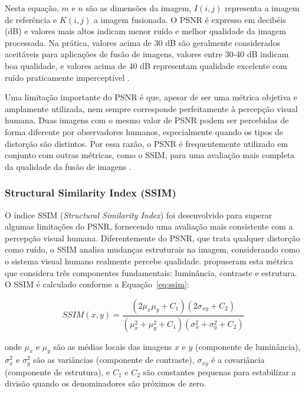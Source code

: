 Nesta equação, $m$ e $n$ são as dimensões da imagem, $I(i,j)$ representa a imagem de referência e $K(i,j)$ a imagem fusionada. O PSNR é expresso em decibéis (dB) e valores mais altos indicam menor ruído e melhor qualidade da imagem processada. Na prática, valores acima de 30 dB são geralmente considerados aceitáveis para aplicações de fusão de imagens, valores entre 30-40 dB indicam boa qualidade, e valores acima de 40 dB representam qualidade excelente com ruído praticamente imperceptível \cite{hore2010image}.

Uma limitação importante do PSNR é que, apesar de ser uma métrica objetiva e amplamente utilizada, nem sempre corresponde perfeitamente à percepção visual humana. Duas imagens com o mesmo valor de PSNR podem ser percebidas de forma diferente por observadores humanos, especialmente quando os tipos de distorção são distintos. Por essa razão, o PSNR é frequentemente utilizado em conjunto com outras métricas, como o SSIM, para uma avaliação mais completa da qualidade da fusão de imagens \cite{hore2010image}.

\subsubsection{Structural Similarity Index (SSIM)}

O índice SSIM (\textit{Structural Similarity Index}) foi desenvolvido para superar algumas limitações do PSNR, fornecendo uma avaliação mais consistente com a percepção visual humana. Diferentemente do PSNR, que trata qualquer distorção como ruído, o SSIM analisa mudanças estruturais na imagem, considerando como o sistema visual humano realmente percebe qualidade. \cite{wang2004image} propuseram esta métrica que considera três componentes fundamentais: luminância, contraste e estrutura. O SSIM é calculado conforme a Equação~\ref{eq:ssim}:

\begin{equation}
\label{eq:ssim}
SSIM(x,y) = \frac{(2\mu_x\mu_y + C_1)(2\sigma_{xy} + C_2)}{(\mu^2_x + \mu^2_y + C_1)(\sigma^2_x + \sigma^2_y + C_2)}
\end{equation}

\noindent onde $\mu_x$ e $\mu_y$ são as médias locais das imagens $x$ e $y$ (componente de luminância), $\sigma^2_x$ e $\sigma^2_y$ são as variâncias (componente de contraste), $\sigma_{xy}$ é a covariância (componente de estrutura), e $C_1$ e $C_2$ são constantes pequenas para estabilizar a divisão quando os denominadores são próximos de zero.

